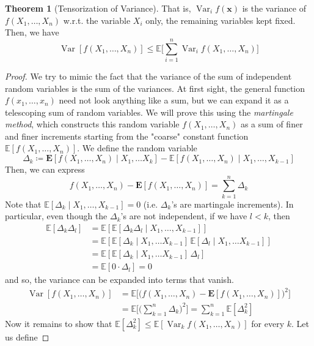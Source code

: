 \documentclass{article}
\DeclareMathOperator{\Var}{Var}
\theoremstyle{definition}
\newtheorem{theorem}{Theorem}[section]
\theoremstyle{remark}
\theoremstyle{definition}
\begin{document}
  \begin{theorem}[Tensorization of Variance]
  That is, $\Var_i f(\mathbf{x})$ is the variance of $f(X_1, \ldots, X_n)$ w.r.t. the variable $X_i$ only, the remaining variables kept fixed. Then, we have 
  \[\Var[f(X_1, \ldots, X_n)] \leq \mathbb{E} \bigg[ \sum_{i=1}^n \Var_i f(X_1, \ldots, X_n) \bigg] \]
  \end{theorem}
  \begin{proof}
  We try to mimic the fact that the variance of the sum of independent random variables is the sum of the variances. At first sight, the general function $f(x_1, \ldots, x_n)$ need not look anything like a sum, but we can expand it as a telescoping sum of random variables. We will prove this using the \textit{martingale method}, which constructs this random variable $f(X_1, \ldots, X_n)$ as a sum of finer and finer increments starting from the "coarse" constant function $\mathbb{E}[f(X_1, \ldots, X_n)]$. We define the random variable 
  \[\Delta_k \coloneqq \mathbf{E}[ f(X_1, \ldots, X_n) \mid X_1, \ldots X_k] - \mathbb{E}[ f(X_1, \ldots, X_n) \mid X_1, \ldots, X_{k-1}]\]
  Then, we can express 
  \[f( X_1, \ldots, X_n) - \mathbf{E}[ f(X_1, \ldots, X_n)] = \sum_{k=1}^n \Delta_k\]
  Note that $\mathbb{E}[\Delta_k \mid X_1, \ldots, X_{k-1}] = 0$ (i.e. $\Delta_k$'s are martingale increments). In particular, even though the $\Delta_k$'s are not independent, if we have $l < k$, then 
  \begin{align*}
      \mathbb{E}[ \Delta_k \Delta_l] & = \mathbb{E}[ \mathbb{E}[\Delta_k \Delta_l \mid X_1, \ldots, X_{k-1}]] \\
      & = \mathbb{E}[ \mathbb{E}[\Delta_k \mid X_1, \ldots X_{k-1} ] \, \mathbb{E}[\Delta_l \mid X_1, \ldots X_{k-1} ]] \\
      & = \mathbb{E}[ \mathbb{E}[\Delta_k \mid X_1, \ldots X_{k-1} ] \, \Delta_l] \\
      & = \mathbb{E}[0 \cdot \Delta_l] = 0
  \end{align*}
  and so, the variance can be expanded into terms that vanish. 
  \begin{align*}
      \Var[ f(X_1, \ldots, X_n)] & = \mathbb{E} \big[ \big( f( X_1, \ldots, X_n) - \mathbf{E}[ f(X_1, \ldots, X_n)] \big)^2\big] \\
      & = \mathbb{E} \bigg[ \bigg( \sum_{k=1}^n \Delta_k \bigg)^2 \bigg] = \sum_{k=1}^n \mathbb{E}[ \Delta_k^2]
  \end{align*}
  Now it remains to show that $\mathbb{E}[\Delta_k^2] \leq \mathbb{E}[\Var_k f(X_1, \ldots, X_n)]$ for every $k$. Let us define 

\end{proof}
\end{document}
